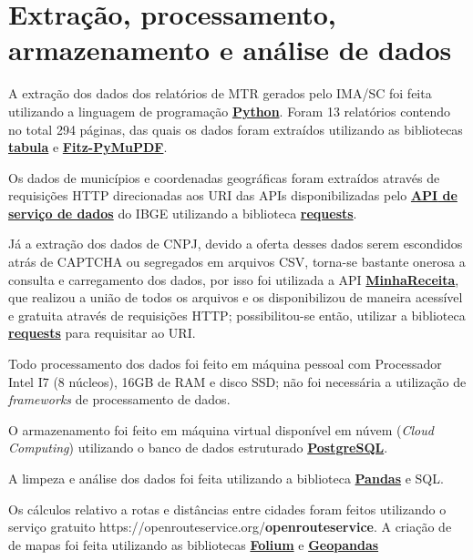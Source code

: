 \section{Extração, processamento, armazenamento e análise de dados}

A extração dos dados dos relatórios de \gls{MTR} gerados pelo \gls{IMA/SC} foi feita utilizando a linguagem de programação \href{https://www.python.org/}{\textbf{Python}}. Foram 13 relatórios contendo no total 294 páginas, das quais os dados foram extraídos utilizando as bibliotecas \href{https://tabula.technology/}{\textbf{tabula}} e \href{https://pymupdf.readthedocs.io/en/latest/}{\textbf{Fitz-PyMuPDF}}.

Os dados de municípios e coordenadas geográficas foram extraídos através de requisições \gls{HTTP} direcionadas aos \gls{URI} das \gls{API}s disponibilizadas pelo \href{https://servicodados.ibge.gov.br/api/docs/}{\textbf{\gls{API} de serviço de dados}} do \gls{IBGE} utilizando a biblioteca \href{https://pypi.org/project/requests/}{\textbf{requests}}.

Já a extração dos dados de \gls{CNPJ}, devido a oferta desses dados serem escondidos atrás de \gls{CAPTCHA} ou segregados em arquivos \gls{CSV}, torna-se bastante onerosa a consulta e carregamento dos dados, por isso foi utilizada a \gls{API} \href{https://docs.minhareceita.org/}{\textbf{MinhaReceita}}, que realizou a união de todos os arquivos e os disponibilizou de maneira acessível e gratuita através de requisições \gls{HTTP}; possibilitou-se então, utilizar a biblioteca \href{https://pypi.org/project/requests/}{\textbf{requests}} para requisitar ao \gls{URI}.

Todo processamento dos dados foi feito em máquina pessoal com Processador Intel I7 (8 núcleos), 16GB de \gls{RAM} e disco \gls{SSD}; não foi necessária a utilização de \textit{frameworks} de processamento de dados.

O armazenamento foi feito em máquina virtual disponível em núvem (\textit{Cloud Computing}) utilizando o banco de dados estruturado \href{https://www.postgresql.org/}{\textbf{PostgreSQL}}.

A limpeza e análise dos dados foi feita utilizando a biblioteca \href{https://pandas.pydata.org/}{\textbf{Pandas}} e \gls{SQL}.

Os cálculos relativo a rotas e distâncias entre cidades foram feitos utilizando o serviço gratuito {https://openrouteservice.org/}{\textbf{openrouteservice}}. A criação de de mapas foi feita utilizando as bibliotecas \href{https://pypi.org/project/folium/}{\textbf{Folium}} e \href{https://geopandas.org/en/stable/}{\textbf{Geopandas}}

